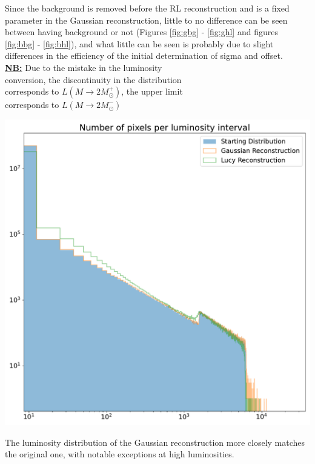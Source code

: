 \documentclass[a4paper]{article}
\newenvironment{Figure}
	{\par\medskip\noindent\minipage{\linewidth}}
	{\endminipage\par\medskip}
\begin{document}
\begin{multicols}{2}
			Since the background is removed before the RL reconstruction and is a fixed parameter in the Gaussian reconstruction, little to no difference can be seen between having background or not (Figures \ref{fig:gbg} - \ref{fig:ghl} and figures \ref{fig:bbg} - \ref{fig:bhl}), and what little can be seen is probably due to slight differences in the efficiency of the initial determination of sigma and offset.\\
			\newline
			\newline
			\underline{\textbf{NB:}} Due to the mistake in the luminosity\\
			\indent\indent conversion, the discontinuity in the distribution\\
			\indent\indent corresponds to $L(M \rightarrow 2M_{\odot}^+)$, the upper limit\\
			\indent\indent corresponds to $L(M \rightarrow 2M_{\odot}^-)$\\
			
			\begin{Figure}
				\centering
				\includegraphics[width=\linewidth]{gauss2_lumin.pdf}
				\label{fig:gl}
			\end{Figure}
			
			The luminosity distribution of the Gaussian reconstruction more closely matches the original one, with notable exceptions at high luminosities.\\
			

\end{multicols}
\end{document}
